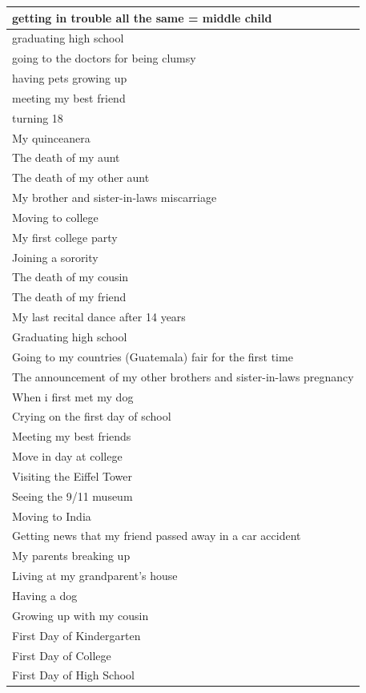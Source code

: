 \documentclass[
  .7em,
  letterpaper,
  DIV=11,
  numbers=noendperiod]{scrartcl}
\begin{document}
\begin{table}
\begin{tabular}{l}
\hline
getting in trouble all the same = middle child\\
\hline
graduating high school\\
\hline
going to the doctors for being clumsy\\
\hline
having pets growing up\\
\hline
meeting my best friend\\
\hline
turning 18\\
\hline
My quinceanera\\
\hline
The death of my aunt\\
\hline
The death of my other aunt\\
\hline
My brother and sister-in-laws miscarriage\\
\hline
Moving to college\\
\hline
My first college party\\
\hline
Joining a sorority\\
\hline
The death of my cousin\\
\hline
The death of my friend\\
\hline
My last recital dance after 14 years\\
\hline
Graduating high school\\
\hline
Going to my countries (Guatemala) fair for the first time\\
\hline
The announcement of my other brothers and sister-in-laws pregnancy\\
\hline
When i first met my dog\\
\hline
Crying on the first day of school\\
\hline
Meeting my best friends\\
\hline
Move in day at college\\
\hline
Visiting the Eiffel Tower\\
\hline
Seeing the 9/11 museum\\
\hline
Moving to India\\
\hline
Getting news that my friend passed away in a car accident\\
\hline
My parents breaking up\\
\hline
Living at my grandparent's house\\
\hline
Having a dog\\
\hline
Growing up with my cousin\\
\hline
First Day of Kindergarten\\
\hline
First Day of College\\
\hline
First Day of High School\\

\end{tabular}
\end{table}
\end{document}

